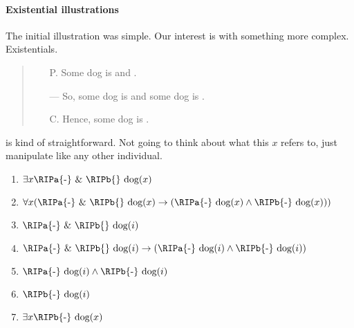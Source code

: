 \paragraph*{Existential illustrations}

\begin{note}
  The initial illustration was simple.
  Our interest is with something more complex.
  Existentials.

  \begin{quote}
    \begin{itemize}
    \item[P.] Some dog is \RIPa{} and \RIPb{}.
    \item[---] So, some dog is \RIPa{} and some dog is \RIPb{}.
    \item[C.] Hence, some dog is \RIPb{}.
    \end{itemize}
  \end{quote}
\end{note}

\begin{note}[Exists \nr{}]
  \nr{} is kind of straightforward.
  Not going to think about what this \(x\) refers to, just manipulate like any other individual.

    \begin{illustration}\label{ill:dog:E:nr}
    \vspace{-\baselineskip}
    \begin{enumerate}[label=\(\protect\iEDogd\)\space\arabic*., ref=(\(\protect\iEDogd\)\space\arabic*), align=left, leftmargin=*]
    \item\label{ill:iDogd:E:abd} \(\exists x \text{\RIPa{-} \& \RIPb{} dog}(x)\)
    \item\label{ill:iDogd:E:sep-gen} \(\forall x(\text{\RIPa{-} \& \RIPb{} dog}(x) \rightarrow (\text{\RIPa{-} dog}(x) \land \text{\RIPb{-} dog}(x)))\)
    \item\label{ill:iDogd:E:abd-2} \(\text{\RIPa{-} \& \RIPb{} dog}(i)\)
    \item\label{ill:iDogd:E:sep-app} \(\text{\RIPa{-} \& \RIPb{} dog}(i) \rightarrow (\text{\RIPa{-} dog}(i) \land \text{\RIPb{-} dog}(i))\)
    \item\label{ill:iDogd:E:sep-con} \(\text{\RIPa{-} dog}(i) \land \text{\RIPb{-} dog}(i)\)
    \item\label{ill:iDogd:E:inst} \(\text{\RIPb{-} dog}(i)\)
    \item\label{ill:iDogd:E:done} \(\exists x\text{\RIPb{-} dog}(x)\)
    \end{enumerate}
    \vspace{-\baselineskip}
  \end{illustration}
\end{note}

